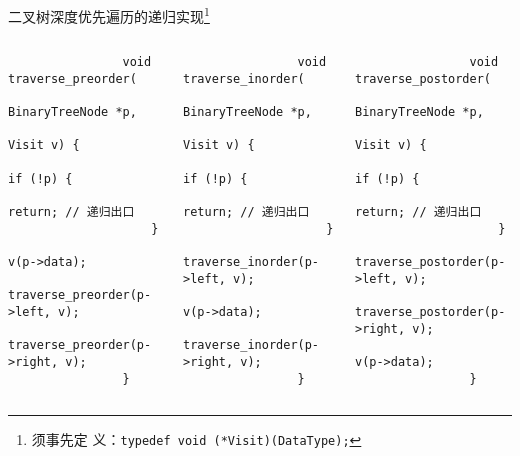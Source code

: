 \begin{fragile}
    \frametitle{\insertsubsectionhead}
    \begin{block}{二叉树深度优先遍历的递归实现\footnote{须事先定
                  义：\texttt{typedef void
                  (*Visit)(DataType);}}}
        \begin{columns}
            \begin{verbatim}
                void traverse_preorder(
                        BinaryTreeNode *p,
                        Visit v) {
                    if (!p) {
                        return; // 递归出口
                    }
                    v(p->data);
                    traverse_preorder(p->left, v);
                    traverse_preorder(p->right, v);
                }
            \end{verbatim}
            \begin{verbatim}
                void traverse_inorder(
                        BinaryTreeNode *p,
                        Visit v) {
                    if (!p) {
                        return; // 递归出口
                    }
                    traverse_inorder(p->left, v);
                    v(p->data);
                    traverse_inorder(p->right, v);
                }
            \end{verbatim}
            \begin{verbatim}
                void traverse_postorder(
                        BinaryTreeNode *p,
                        Visit v) {
                    if (!p) {
                        return; // 递归出口
                    }
                    traverse_postorder(p->left, v);
                    traverse_postorder(p->right, v);
                    v(p->data);
                }
            \end{verbatim}
        \end{columns}
    \end{block}
\end{fragile}

